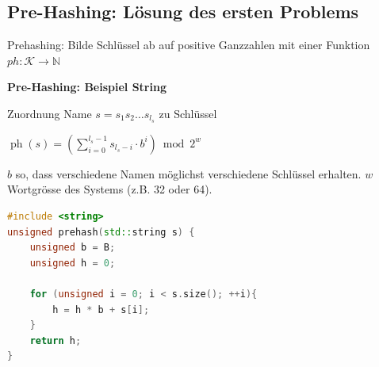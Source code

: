 \begin{sectionbox}
\subsection{Pre-Hashing: Lösung des ersten Problems}\smallskip
Prehashing: Bilde Schlüssel ab auf positive Ganzzahlen mit einer Funktion $ph: \mathcal{K} \rightarrow \mathbb{N}$\par\smallskip
\textbf{Pre-Hashing: Beispiel String}\par
Zuordnung Name $s=s_{1} s_{2} \ldots s_{l_{s}}$ zu Schlüssel\par\smallskip
\begin{center}
    $\operatorname{ph}(s)=\left(\sum_{i=0}^{l_{s}-1} s_{l_{s}-i} \cdot b^{i}\right) \bmod 2^{w}$
\end{center}\par\smallskip
$b$ so, dass verschiedene Namen möglichst verschiedene Schlüssel erhalten.
$w$ Wortgrösse des Systems (z.B. 32 oder 64).\par\smallskip
\begin{lstlisting}[language=C++]
#include <string>
unsigned prehash(std::string s) {
    unsigned b = B;
    unsigned h = 0;
    
    for (unsigned i = 0; i < s.size(); ++i){
        h = h * b + s[i];
    }
    return h;
}
\end{lstlisting}\vspace{-6px}
\end{sectionbox}
\vspace{-4pt}
